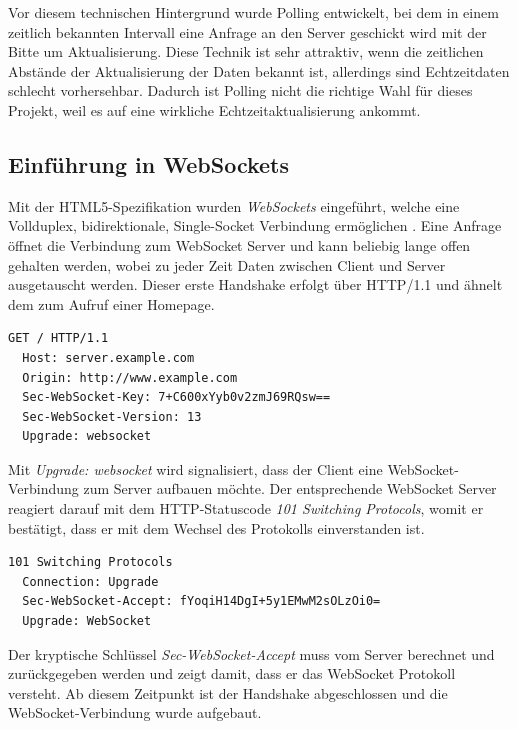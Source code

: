 Vor diesem technischen Hintergrund wurde Polling entwickelt, bei dem in einem zeitlich bekannten Intervall eine Anfrage an den Server geschickt wird mit der Bitte um Aktualisierung. Diese Technik ist sehr attraktiv, wenn die zeitlichen Abstände der Aktualisierung der Daten bekannt ist, allerdings sind Echtzeitdaten schlecht vorhersehbar. Dadurch ist Polling nicht die richtige Wahl für dieses Projekt, weil es auf eine wirkliche Echtzeitaktualisierung ankommt.\par

\subsection{Einführung in WebSockets}
Mit der HTML5-Spezifikation wurden \emph{WebSockets} eingeführt, welche eine Vollduplex, bidirektionale, Single-Socket Verbindung ermöglichen \cite[S. 7]{ws}. Eine Anfrage öffnet die Verbindung zum WebSocket Server und kann beliebig lange offen gehalten werden, wobei zu jeder Zeit Daten zwischen Client und Server ausgetauscht werden. Dieser erste Handshake erfolgt über HTTP/1.1 und ähnelt dem zum Aufruf einer Homepage.
\\
\begin{lstlisting}[captionpos=b, caption=HTTP Request vom Client {\cite[S. 6]{rfc6455:handshake}}]
  GET / HTTP/1.1
  Host: server.example.com
  Origin: http://www.example.com
  Sec-WebSocket-Key: 7+C600xYyb0v2zmJ69RQsw==
  Sec-WebSocket-Version: 13
  Upgrade: websocket
\end{lstlisting}

Mit \emph{Upgrade: websocket} wird signalisiert, dass der Client eine WebSocket-Verbindung zum Server aufbauen möchte. Der entsprechende WebSocket Server reagiert darauf mit dem HTTP-Statuscode \emph{101 Switching Protocols}, womit er bestätigt, dass er mit dem Wechsel des Protokolls einverstanden ist.
\\
\begin{lstlisting}[captionpos=b, caption=HTTP Response vom Server {\cite[S. 8]{rfc6455:handshake}}]
  101 Switching Protocols
  Connection: Upgrade
  Sec-WebSocket-Accept: fYoqiH14DgI+5y1EMwM2sOLzOi0=
  Upgrade: WebSocket
\end{lstlisting}

Der kryptische Schlüssel \emph{Sec-WebSocket-Accept} muss vom Server berechnet und zurückgegeben werden und zeigt damit, dass er das WebSocket Protokoll versteht. Ab diesem Zeitpunkt ist der Handshake abgeschlossen und die WebSocket-Verbindung wurde aufgebaut.\par

